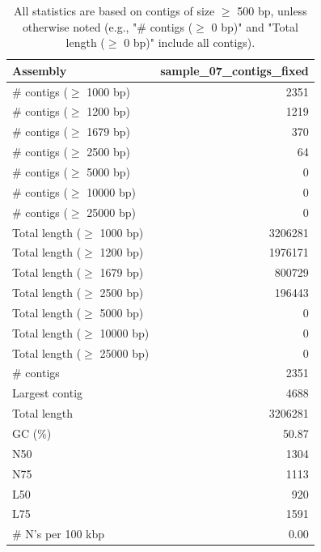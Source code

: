 \documentclass[12pt,a4paper]{article}
\begin{document}
\begin{table}[ht]
\begin{center}
\caption{All statistics are based on contigs of size $\geq$ 500 bp, unless otherwise noted (e.g., "\# contigs ($\geq$ 0 bp)" and "Total length ($\geq$ 0 bp)" include all contigs).}
\begin{tabular}{|l*{1}{|r}|}
\hline
Assembly & sample\_07\_contigs\_fixed \\ \hline
\# contigs ($\geq$ 1000 bp) & 2351 \\ \hline
\# contigs ($\geq$ 1200 bp) & 1219 \\ \hline
\# contigs ($\geq$ 1679 bp) & 370 \\ \hline
\# contigs ($\geq$ 2500 bp) & 64 \\ \hline
\# contigs ($\geq$ 5000 bp) & 0 \\ \hline
\# contigs ($\geq$ 10000 bp) & 0 \\ \hline
\# contigs ($\geq$ 25000 bp) & 0 \\ \hline
Total length ($\geq$ 1000 bp) & 3206281 \\ \hline
Total length ($\geq$ 1200 bp) & 1976171 \\ \hline
Total length ($\geq$ 1679 bp) & 800729 \\ \hline
Total length ($\geq$ 2500 bp) & 196443 \\ \hline
Total length ($\geq$ 5000 bp) & 0 \\ \hline
Total length ($\geq$ 10000 bp) & 0 \\ \hline
Total length ($\geq$ 25000 bp) & 0 \\ \hline
\# contigs & 2351 \\ \hline
Largest contig & 4688 \\ \hline
Total length & 3206281 \\ \hline
GC (\%) & 50.87 \\ \hline
N50 & 1304 \\ \hline
N75 & 1113 \\ \hline
L50 & 920 \\ \hline
L75 & 1591 \\ \hline
\# N's per 100 kbp & 0.00 \\ \hline
\end{tabular}
\end{center}
\end{table}
\end{document}
